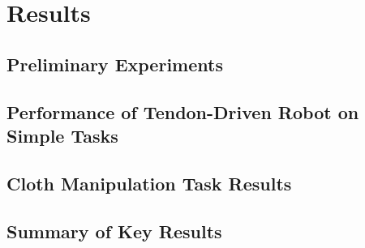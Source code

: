 \chapter{Results}\label{ch:results}

\section{Preliminary Experiments} %

\section{Performance of Tendon-Driven Robot on Simple Tasks}

\section{Cloth Manipulation Task Results}

\section{Summary of Key Results}
